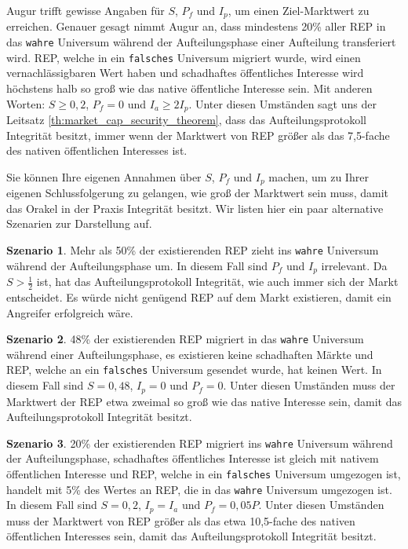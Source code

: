 \documentclass[floatfix,reprint,nofootinbib,amsmath,amssymb,epsfig,pre,floats,letterpaper,groupedaffiliation]{revtex4-1}
\theoremstyle{definition}
\theoremstyle{definition}
\theoremstyle{definition}
\newtheorem{scenario}{Szenario}
\begin{document}
\begin{appendix}
Augur trifft gewisse Angaben für $S$, $P_f$ und $I_p$, um einen Ziel-Marktwert zu erreichen. Genauer gesagt nimmt Augur an, dass mindestens 20\% aller REP in das \texttt{wahre} Universum während der Aufteilungsphase einer Aufteilung transferiert wird. REP, welche in ein \texttt{falsches} Universum migriert wurde, wird einen vernachlässigbaren Wert haben und schadhaftes öffentliches Interesse wird höchstens halb so groß wie das native öffentliche Interesse sein. Mit anderen Worten: $S \geq 0,2$, $P_f=0$ und $I_a \geq 2 I_p$. Unter diesen Umständen sagt uns der Leitsatz \ref{th:market_cap_security_theorem}, dass das Aufteilungsprotokoll Integrität besitzt, immer wenn der Marktwert von REP größer als das 7,5-fache des nativen öffentlichen Interesses ist.

Sie können Ihre eigenen Annahmen über $S$, $P_f$ und $I_p$ machen, um zu Ihrer eigenen Schlussfolgerung zu gelangen, wie groß der Marktwert sein muss, damit das Orakel in der Praxis Integrität besitzt. Wir listen hier ein paar alternative Szenarien zur Darstellung auf.

\begin{scenario}
Mehr als 50\% der existierenden REP zieht ins \texttt{wahre} Universum während der Aufteilungsphase um. In diesem Fall sind $P_f$ und $I_p$ irrelevant. Da $S > \frac{1}{2}$ ist, hat das Aufteilungsprotokoll Integrität, wie auch immer sich der Markt entscheidet. Es würde nicht genügend REP auf dem Markt existieren, damit ein Angreifer erfolgreich wäre.
\end{scenario}

\begin{scenario}
48\% der existierenden REP migriert in das \texttt{wahre} Universum während einer Aufteilungsphase, es existieren keine schadhaften Märkte und REP, welche an ein \texttt{falsches} Universum gesendet wurde, hat keinen Wert. In diesem Fall sind $S=0,48$, $I_p=0$ und $P_f=0$. Unter diesen Umständen muss der Marktwert der REP etwa zweimal so groß wie das native Interesse sein, damit das Aufteilungsprotokoll Integrität besitzt.
\end{scenario}

\begin{scenario}
20\% der existierenden REP migriert ins \texttt{wahre} Universum während der Aufteilungsphase, schadhaftes öffentliches Interesse ist gleich mit nativem öffentlichen Interesse und REP, welche in ein \texttt{falsches} Universum umgezogen ist, handelt mit 5\% des Wertes an REP, die in das \texttt{wahre} Universum umgezogen ist. In diesem Fall sind $S = 0,2$, $I_p = I_a$ und $P_f = 0,05P$. Unter diesen Umständen muss der Marktwert von REP größer als das etwa 10,5-fache des nativen öffentlichen Interesses sein, damit das Aufteilungsprotokoll Integrität besitzt.
\end{scenario}


\end{appendix}
\end{document}
